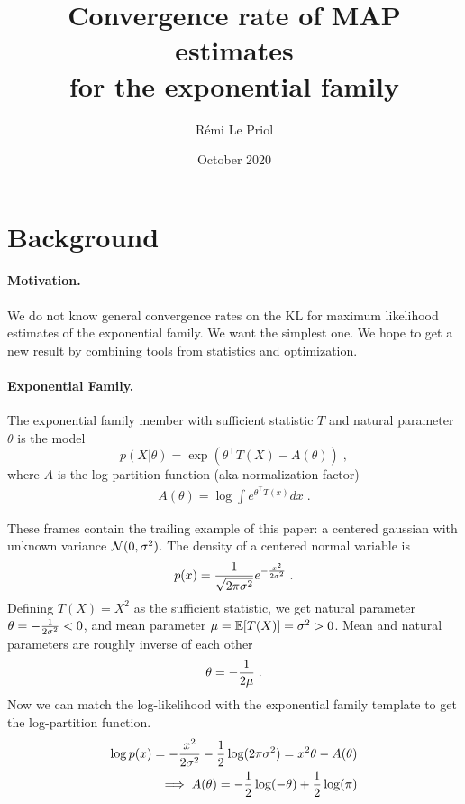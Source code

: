 \documentclass{article}
\title{Convergence rate of MAP estimates \\
for the exponential family}
\author{R\'emi Le Priol}
\date{October 2020}
\newcommand{\logpart}{A}
\newcommand{\nat}{\theta}
\begin{document}
\maketitle

\section{Background}

\paragraph{Motivation.} 
We do not know general convergence rates on the KL for maximum likelihood estimates of the exponential family.
We want the simplest one.
We hope  to get a new result by combining tools from statistics and optimization. 
\paragraph{Exponential Family.}
The exponential family member with sufficient statistic $T$ and natural parameter $\nat$ is the model 
\begin{equation}
	 p(X|\nat) = \exp( \nat^\top T(X) - \logpart(\nat)) \; ,
\end{equation}
where $\logpart$ is the log-partition function (aka normalization factor) 
\begin{align}
    \logpart(\nat) = \log \int e^{\nat^\top T(x)} dx \; .
\end{align}

\begin{example}
	These frames contain the trailing example of this paper: a centered gaussian with unknown variance ${\mathcal N}(0,\sigma^2)$.
	The density of a centered normal variable is
\begin{align}
	p(x) = \frac{1}{\sqrt{2\pi \sigma^2}} e^{-\frac{x^2}{2 \sigma^2}} \; .
\end{align}
Defining $T(X)=X^2$ as the sufficient statistic, we get natural parameter $\nat = -\inv{2 \sigma^2} <0$, and mean parameter $\mu=\operatorname{\mathbb{E}}[T(X)] = \sigma^2 >0$. 
Mean and natural parameters are roughly inverse of each other
\begin{align}
	\nat = -\inv{2 \mu}\; .
\end{align}
Now we can match the log-likelihood with the exponential family template to get the log-partition function.
\begin{align}
	\log p(x) = - \frac{x^2}{2 \sigma^2} - \half \log(2 \pi \sigma^2 ) 
	= x^2 \nat - \logpart(\nat) \\
	\implies \logpart (\nat) = - \half \log(-\nat)  + \half \log(\pi) 
\end{align}
\end{example}
\end{document}
